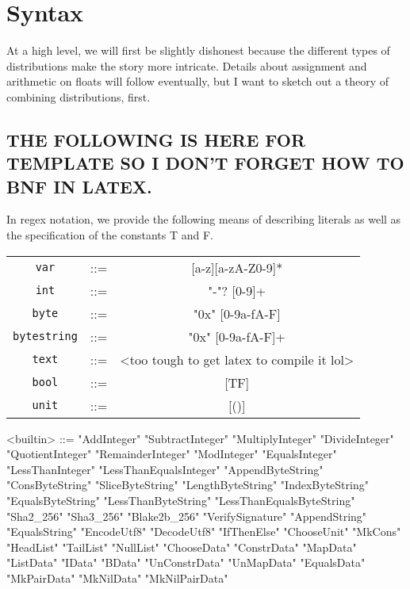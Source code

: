 \documentclass[../main.tex]{subfiles}
\begin{document}
\section{Syntax}\label{section:syntax}

At a high level, we will first be slightly dishonest because the different types of distributions make the story more intricate. Details about assignment and arithmetic on floats will follow eventually, but I want to sketch out a theory of combining distributions, first.





\subsection{THE FOLLOWING IS HERE FOR TEMPLATE SO I DON'T FORGET HOW TO BNF IN LATEX. }

In regex notation, we provide the following means of describing literals as well as the specification of the constants T and F.
    \begin{center}
    \begin{tabular}{c c c}
        \texttt{var} & ::= & [a-z][a-zA-Z0-9]* \\
        \texttt{int} & ::= & "-"? [0-9]+ \\
        \texttt{byte} & ::= & "0x" [0-9a-fA-F] \\
        \texttt{bytestring} & ::= & "0x" [0-9a-fA-F]+ \\
        \texttt{text} & ::= & <too tough to get latex to compile it lol>  \\
        \texttt{bool} & ::= & [TF] \\
        \texttt{unit} & ::= & [()]
    \end{tabular}
    \end{center}
    \label{tab:atomsregex}

\begin{grammar}
    <builtin> ::=
        "AddInteger" \alt "SubtractInteger" \alt "MultiplyInteger"
        \alt "DivideInteger" \alt "QuotientInteger" \alt "RemainderInteger"
        \alt "ModInteger" \alt "EqualsInteger" \alt "LessThanInteger"
        \alt "LessThanEqualsInteger" \alt "AppendByteString"
        \alt "ConsByteString" \alt "SliceByteString" \alt "LengthByteString"
        \alt "IndexByteString" \alt "EqualsByteString" \alt "LessThanByteString"
        \alt "LessThanEqualsByteString" \alt "Sha2_256" \alt "Sha3_256" \alt "Blake2b_256"
        \alt "VerifySignature" \alt "AppendString" \alt "EqualsString"
        \alt "EncodeUtf8" \alt "DecodeUtf8" \alt "IfThenElse" \alt "ChooseUnit"
        \alt "MkCons" \alt "HeadList" \alt "TailList" \alt "NullList"
        \alt "ChooseData" \alt "ConstrData" \alt "MapData" \alt "ListData"
        \alt "IData" \alt "BData" \alt "UnConstrData" \alt "UnMapData"
        \alt "EqualsData" \alt "MkPairData" \alt "MkNilData" \alt "MkNilPairData"
\end{grammar}
\end{document}
